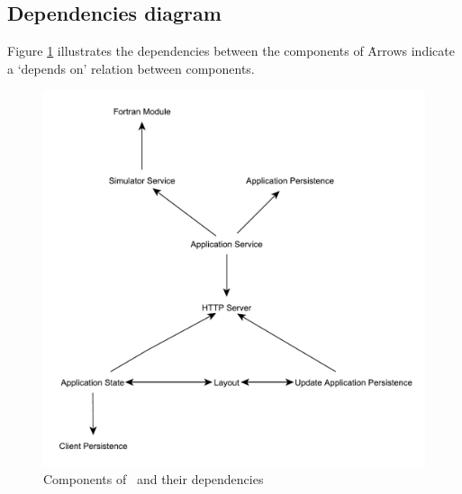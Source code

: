 \subsection{Dependencies diagram}
\label{subsec:depdiag}
Figure \ref{fig:compdependencies} illustrates the dependencies between the components of \projectname\. Arrows indicate a `depends on' relation between components.

\noindent
\begin{figure}
	\centering
	\includegraphics[width=\textwidth]{ComponentDependencies}
	\caption{Components of \projectname\ and their dependencies}
	\label{fig:compdependencies}
\end{figure}






